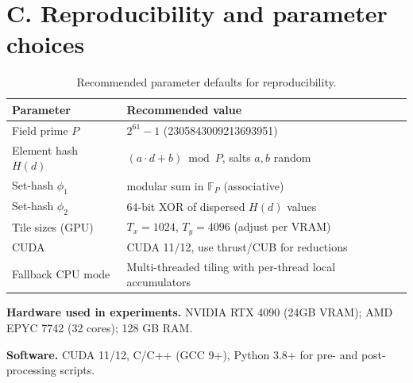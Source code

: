 \documentclass[11pt]{article}
\begin{document}
\section*{C. Reproducibility and parameter choices}

\begin{table}[h!]\centering
\caption{Recommended parameter defaults for reproducibility.}\label{tab:params}
\begin{tabular}{l l}
\toprule
Parameter & Recommended value \\
\midrule
Field prime $P$ & $2^{61}-1$ (2305843009213693951) \\
Element hash $H(d)$ & $(a\cdot d + b) \bmod P$, salts $a,b$ random \\
Set-hash $\phi_1$ & modular sum in $\mathbb{F}_P$ (associative) \\
Set-hash $\phi_2$ & 64-bit XOR of dispersed $H(d)$ values \\
Tile sizes (GPU) & $T_x=1024$, $T_y=4096$ (adjust per VRAM) \\
CUDA & CUDA 11/12, use thrust/CUB for reductions \\
Fallback CPU mode & Multi-threaded tiling with per-thread local accumulators \\
\bottomrule
\end{tabular}
\end{table}

\bigskip
\noindent\textbf{Hardware used in experiments.} NVIDIA RTX 4090 (24GB VRAM); AMD EPYC 7742 (32 cores); 128 GB RAM.

\bigskip
\noindent\textbf{Software.} CUDA 11/12, C/C++ (GCC 9+), Python 3.8+ for pre- and post-processing scripts.
\end{document}
